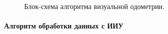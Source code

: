 \begin{figure}[H]
\caption{Блок-схема алгоритма визуальной одометрии.}
\label{pic:visualOdometryAlgo}
\end{figure}


\paragraph{Алгоритм обработки данных с ИИУ}

